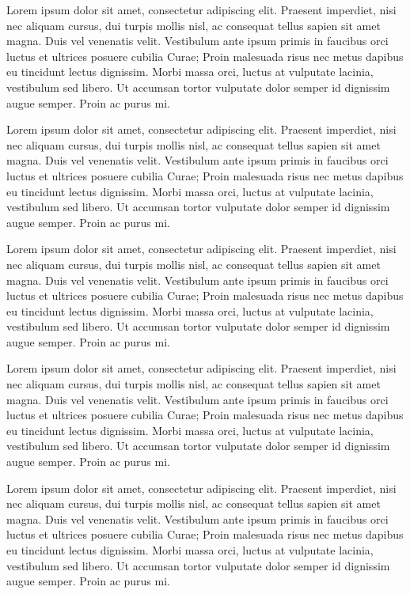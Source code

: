 Lorem ipsum dolor sit amet, consectetur adipiscing elit. Praesent imperdiet, nisi 
nec aliquam cursus, dui turpis mollis nisl, ac consequat tellus sapien sit amet 
magna. Duis vel venenatis velit. Vestibulum ante ipsum primis in faucibus orci 
luctus et ultrices posuere cubilia Curae; Proin malesuada risus nec metus dapibus 
eu tincidunt lectus dignissim. Morbi massa orci, luctus at vulputate lacinia, 
vestibulum sed libero. Ut accumsan tortor vulputate dolor semper id dignissim 
augue semper. Proin ac purus mi. 

Lorem ipsum dolor sit amet, consectetur adipiscing elit. Praesent imperdiet, nisi 
nec aliquam cursus, dui turpis mollis nisl, ac consequat tellus sapien sit amet 
magna. Duis vel venenatis velit. Vestibulum ante ipsum primis in faucibus orci 
luctus et ultrices posuere cubilia Curae; Proin malesuada risus nec metus dapibus 
eu tincidunt lectus dignissim. Morbi massa orci, luctus at vulputate lacinia, 
vestibulum sed libero. Ut accumsan tortor vulputate dolor semper id dignissim 
augue semper. Proin ac purus mi. 

Lorem ipsum dolor sit amet, consectetur adipiscing elit. Praesent imperdiet, nisi 
nec aliquam cursus, dui turpis mollis nisl, ac consequat tellus sapien sit amet 
magna. Duis vel venenatis velit. Vestibulum ante ipsum primis in faucibus orci 
luctus et ultrices posuere cubilia Curae; Proin malesuada risus nec metus dapibus 
eu tincidunt lectus dignissim. Morbi massa orci, luctus at vulputate lacinia, 
vestibulum sed libero. Ut accumsan tortor vulputate dolor semper id dignissim 
augue semper. Proin ac purus mi. 

Lorem ipsum dolor sit amet, consectetur adipiscing elit. Praesent imperdiet, nisi 
nec aliquam cursus, dui turpis mollis nisl, ac consequat tellus sapien sit amet 
magna. Duis vel venenatis velit. Vestibulum ante ipsum primis in faucibus orci 
luctus et ultrices posuere cubilia Curae; Proin malesuada risus nec metus dapibus 
eu tincidunt lectus dignissim. Morbi massa orci, luctus at vulputate lacinia, 
vestibulum sed libero. Ut accumsan tortor vulputate dolor semper id dignissim 
augue semper. Proin ac purus mi. 

Lorem ipsum dolor sit amet, consectetur adipiscing elit. Praesent imperdiet, nisi 
nec aliquam cursus, dui turpis mollis nisl, ac consequat tellus sapien sit amet 
magna. Duis vel venenatis velit. Vestibulum ante ipsum primis in faucibus orci 
luctus et ultrices posuere cubilia Curae; Proin malesuada risus nec metus dapibus 
eu tincidunt lectus dignissim. Morbi massa orci, luctus at vulputate lacinia, 
vestibulum sed libero. Ut accumsan tortor vulputate dolor semper id dignissim 
augue semper. Proin ac purus mi. 


